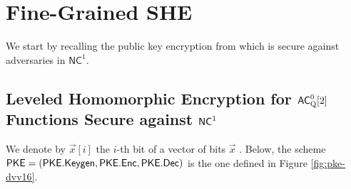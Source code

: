 \section{Fine-Grained SHE}
\label{sec:he}
\label{sec:HE}

We start by recalling the public key encryption from \cite{fgcrypto} which is 
secure against adversaries in $\mathsf{NC}^1$. 


 
\subsection{Leveled Homomorphic Encryption for ${\mathsf{AC}}^0_{\text{Q}}[2]$ Functions Secure against ${\mathsf{NC}}^1$}
\label{sec:leveled-he-simple}
 

We denote by $\vec{x}[i]$ the $i$-th bit of a vector of bits $\vec{x}$ . Below, the scheme $\mathsf{PKE} = (\mathsf{PKE.Keygen},\mathsf{PKE.Enc}, \mathsf{PKE.Dec})$ is the one defined in Figure \ref{fig:pke-dvv16}.

